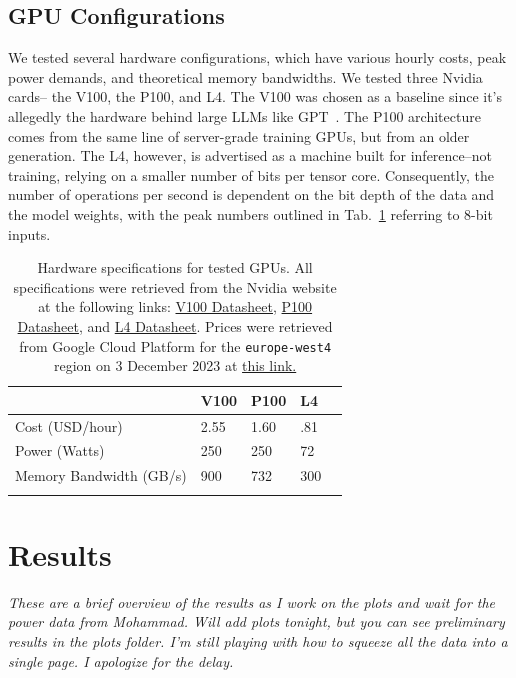 \documentclass[conference]{IEEEtran}
\newcommand{\cm}[1]{\textit{{\color{blue}#1}}}
\begin{document}
\subsection{GPU Configurations}
We tested several hardware configurations, which have various hourly costs, peak power demands, and theoretical memory bandwidths. We tested three Nvidia cards-- the V100, the P100, and L4. The V100 was chosen as a baseline since it's allegedly the hardware behind large LLMs like GPT~\cite{}. The P100 architecture comes from the same line of server-grade training GPUs, but from an older generation. The L4, however, is advertised as a machine built for inference--not training, relying on a smaller number of bits per tensor core. Consequently, the number of operations per second is dependent on the bit depth of the data and the model weights, with the peak numbers outlined in Tab.~\ref{tab:hardware} referring to 8-bit inputs.
\begin{table}[h]
\begin{tabular}{lllll}
\hline
                        & V100   & P100   & L4    &  \\ \hline
Cost (USD/hour)          & 2.55 & 1.60 & .81 &  \\
Power (Watts)           & 250    & 250    & 72    &  \\
Memory Bandwidth (GB/s) & 900    & 732    & 300   &  \\ \hline
\label{tab:hardware}
\end{tabular}
\caption{Hardware specifications for tested GPUs. All specifications were retrieved from the Nvidia website at the following links: 
\href{https://images.nvidia.com/content/technologies/volta/pdf/volta-v100-datasheet-update-us-1165301-r5.pdf}{V100 Datasheet},
\href{https://images.nvidia.com/content/tesla/pdf/nvidia-tesla-p100-PCIe-datasheet.pdf}{P100 Datasheet}, and
\href{https://nvdam.widen.net/s/rvq98gbwsw/l4-datasheet-2595652}{L4 Datasheet}. Prices were retrieved from Google Cloud Platform for the \texttt{europe-west4} region on 3 December 2023 at \href{https://cloud.google.com/pricing/list}{this link.}
}
\end{table}

\section{Results}
\cm{These are a brief overview of the results as I work on the plots and wait for the power data from Mohammad. Will add plots tonight, but you can see preliminary results in the plots folder. I'm still playing with how to squeeze all the data into a single page. I apologize for the delay.}
\end{document}
